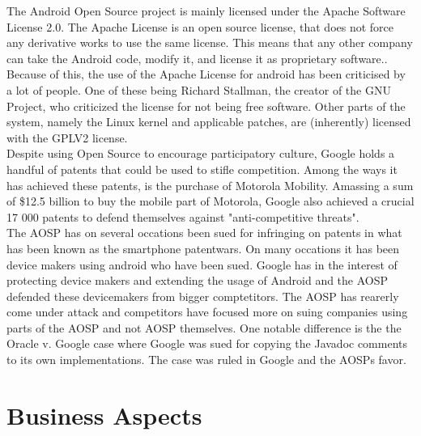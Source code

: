 \documentclass[conference]{IEEEtran}
\begin{document}
The Android Open Source project is mainly licensed under the Apache Software License 2.0. The Apache License is an open source license, that does not force any derivative works to use the same license. This means that any other company can take the Android code, modify it, and license it as proprietary software.\cite{apache-license}. 
\\Because of this, the use of the Apache License for android has been criticised by a lot of people. One of these being Richard Stallman, the creator of the GNU Project, who criticized the license for not being free software.\cite{rms-android} Other parts of the system, namely the Linux kernel and applicable patches, are (inherently) licensed with the GPLV2 license.\cite{gplv2}\cite{android-licenses} 
\\Despite using Open Source to encourage participatory culture, Google holds a handful of patents that could be used to stifle competition.\cite{google-slide-unlock}\cite{google-radial-menu} Among the ways it has achieved these patents, is the purchase of Motorola Mobility. Amassing a sum of \$12.5 billion to buy the mobile part of Motorola, Google also achieved a crucial 17 000 patents to defend themselves against "anti-competitive threats".\cite{Goggin}
\\The AOSP has on several occations been sued for infringing on patents in what has been known as the smartphone patentwars. On many occations it has been device makers using android who have been sued.\cite{android-vApple} Google has in the interest of protecting device makers and extending the usage of Android and the AOSP defended these devicemakers from bigger comptetitors.\cite{google-helps} The AOSP has rearerly come under attack and competitors have focused more on suing companies using parts of the AOSP and not AOSP themselves. One notable difference is the the Oracle v. Google case where Google was sued for copying the Javadoc comments to its own implementations.\cite{android-v-oracle} The case was ruled in Google and the AOSPs favor.


\section{Business Aspects}
\label{financial}
\end{document}

